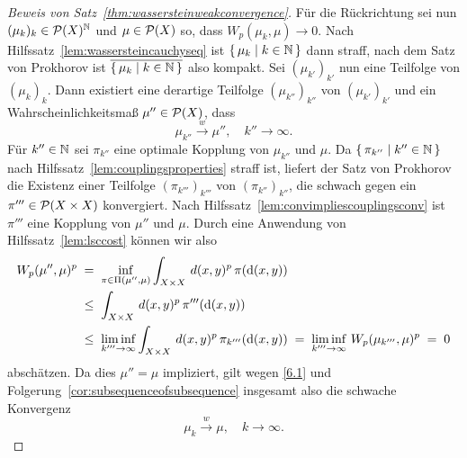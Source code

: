 \documentclass[../main/main.tex]{subfiles}
\begin{document}
\begin{proof}[Beweis von Satz~\ref{thm:wassersteinweakconvergence}]
		Für die Rückrichtung sei nun $(\mu_k)_k \in \mathcal{P}(X)^{\mathbb{N}}$ und $\mu \in \mathcal{P}(X)$ so, dass $W_p(\mu_k, \mu) \to 0$. Nach Hilfssatz~\ref{lem:wassersteincauchyseq} ist $\left\{\, \mu_k \; \middle| \; k \in \mathbb{N} \,\right\}$ dann straff, nach dem Satz von Prokhorov ist $\overline{\left\{\, \mu_k \; \middle| \; k \in \mathbb{N} \,\right\}}$ also kompakt. Sei $(\mu_{k'})_{k'}$ nun eine Teilfolge von $(\mu_k)_k$. Dann existiert eine derartige Teilfolge $(\mu_{k''})_{k''}$ von $(\mu_{k'})_{k'}$ und ein Wahrscheinlichkeitsmaß $\mu'' \in \mathcal{P}(X)$, dass
		\[ \mu_{k''} \xrightarrow{w} \mu'', \quad k'' \to \infty \text{.} \label{6.1} \tag{6.1} \]
		Für $k'' \in \mathbb{N}$ sei $\pi_{k''}$ eine optimale Kopplung von $\mu_{k''}$ und $\mu$. Da $\left\{\, \pi_{k''} \; \middle| \; k'' \in \mathbb{N} \,\right\}$ nach Hilfssatz~\ref{lem:couplingsproperties} straff ist, liefert der Satz von Prokhorov die Existenz einer Teilfolge $(\pi_{k'''})_{k'''}$ von $(\pi_{k''})_{k''}$, die schwach gegen ein $\pi''' \in \mathcal{P}(X \times X)$ konvergiert. Nach Hilfssatz~\ref{lem:convimpliescouplingsconv} ist $\pi'''$ eine Kopplung von $\mu''$ und $\mu$. Durch eine Anwendung von Hilfssatz~\ref{lem:lsccost} können wir also
		\begin{align*}
			W_p(\mu'', \mu)^p \; &= \; \inf_{\pi \in \Pi(\mu'', \mu)} \int_{X \times X} \, d(x, y)^p \, \pi(\mathrm{d}(x, y)) \\
			                \; &\leq \; \int_{X \times X} \, d(x, y)^p \, \pi'''(\mathrm{d}(x, y)) \\
			                \; &\leq \; \liminf_{k''' \to \infty} \int_{X \times X} \, d(x, y)^p \, \pi_{k'''}(\mathrm{d}(x, y)) \; = \; \liminf_{k''' \to \infty} \, W_p( \mu_{k'''}, \mu)^p \; = \; 0
		\end{align*}
		abschätzen. Da dies $\mu'' = \mu$ impliziert, gilt wegen \eqref{6.1} und Folgerung~\ref{cor:subsequenceofsubsequence} insgesamt also die schwache Konvergenz
		\[ \mu_k \xrightarrow{w} \mu, \quad k \to \infty \text{.} \]
	\end{proof}
	
\end{document}
